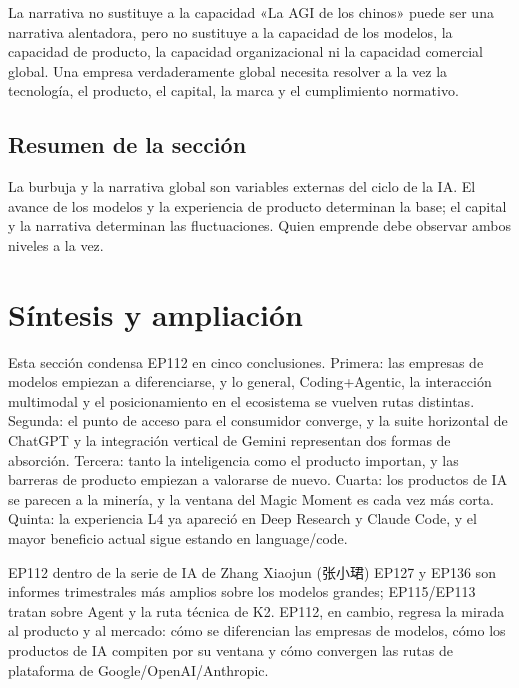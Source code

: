\documentclass[a4paper]{article}
\begin{document}
\begin{warningbox}{La narrativa no sustituye a la capacidad}
«La AGI de los chinos» puede ser una narrativa alentadora, pero no sustituye a la capacidad de los modelos, la capacidad de producto, la capacidad organizacional ni la capacidad comercial global. Una empresa verdaderamente global necesita resolver a la vez la tecnología, el producto, el capital, la marca y el cumplimiento normativo.
\end{warningbox}

\subsection{Resumen de la sección}

La burbuja y la narrativa global son variables externas del ciclo de la IA. El avance de los modelos y la experiencia de producto determinan la base; el capital y la narrativa determinan las fluctuaciones. Quien emprende debe observar ambos niveles a la vez.

\section{Síntesis y ampliación}

Esta sección condensa EP112 en cinco conclusiones. Primera: las empresas de modelos empiezan a diferenciarse, y lo general, Coding+Agentic, la interacción multimodal y el posicionamiento en el ecosistema se vuelven rutas distintas. Segunda: el punto de acceso para el consumidor converge, y la suite horizontal de ChatGPT y la integración vertical de Gemini representan dos formas de absorción. Tercera: tanto la inteligencia como el producto importan, y las barreras de producto empiezan a valorarse de nuevo. Cuarta: los productos de IA se parecen a la minería, y la ventana del Magic Moment es cada vez más corta. Quinta: la experiencia L4 ya apareció en Deep Research y Claude Code, y el mayor beneficio actual sigue estando en language/code.

\begin{importantbox}{EP112 dentro de la serie de IA de Zhang Xiaojun (张小珺)}
EP127 y EP136 son informes trimestrales más amplios sobre los modelos grandes; EP115/EP113 tratan sobre Agent y la ruta técnica de K2. EP112, en cambio, regresa la mirada al producto y al mercado: cómo se diferencian las empresas de modelos, cómo los productos de IA compiten por su ventana y cómo convergen las rutas de plataforma de Google/OpenAI/Anthropic.
\end{importantbox}
\end{document}
